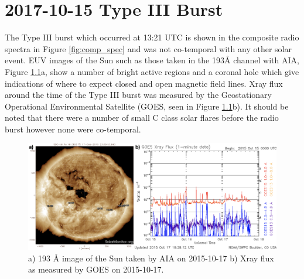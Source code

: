 \chapter{2017-10-15 Type III Burst}
\label{app:event}
The Type III burst which occurred at 13:21 UTC is shown in the composite radio spectra in Figure \ref{fig:comp_spec} and was not co-temporal with any other solar event.
EUV images of the Sun such as those taken in the 193{\AA} channel with AIA, Figure \ref{fig:AIA_GOES}a, show a number of bright active regions and a coronal hole which give indications of where to expect closed and open magnetic field lines.
Xray flux around the time of the Type III burst was measured by the Geostationary Operational Environmental Satellite (GOES, seen in Figure \ref{fig:AIA_GOES}b). It should be noted that there were a number of small C class solar flares before the radio burst however none were co-temporal. 
\newline
\begin{figure}[h]
    \centering
    \includegraphics[width=0.75\columnwidth]{Images/aia_goes.png}
    \caption[193 {\AA} image of the Sun taken by AIA and Xray flux as measured by GOES on 2015-10-17]{a) 193 {\AA} image of the Sun taken by AIA on 2015-10-17 b) Xray flux as measured by GOES on 2015-10-17.}
    \label{fig:AIA_GOES}
\end{figure}

